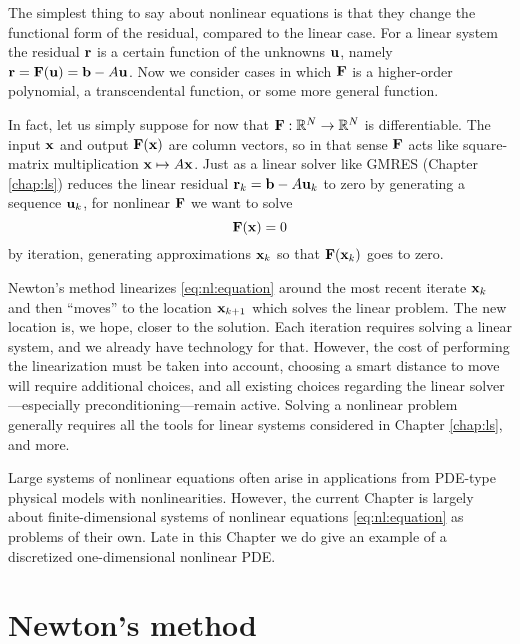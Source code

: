
The simplest thing to say about nonlinear equations is that they change the functional form of the residual, compared to the linear case.  For a linear system the residual $\mathbf{r}$ is a certain function of the unknowns $\mathbf{u}$, namely $\mathbf{r} = \mathbf{F}(\mathbf{u}) = \mathbf{b} - A \mathbf{u}$.  Now we consider cases in which $\mathbf{F}$ is a higher-order polynomial, a transcendental function, or some more general function.

In fact, let us simply suppose for now that $\mathbf{F} : \mathbb{R}^N \to \mathbb{R}^N$ is differentiable.  The input $\mathbf{x}$ and output $\mathbf{F}(\mathbf{x})$ are column vectors, so in that sense $\mathbf{F}$ acts like square-matrix multiplication $\mathbf{x}\mapsto A\mathbf{x}$.  Just as a linear solver like GMRES (Chapter \ref{chap:ls}) reduces the linear residual $\mathbf{r}_k=\mathbf{b} - A \mathbf{u}_k$ to zero by generating a sequence $\mathbf{u}_k$, for nonlinear $\mathbf{F}$ we want to solve
\begin{equation}
   \mathbf{F}(\mathbf{x}) = 0   \label{eq:nl:equation}
\end{equation}
by iteration, generating approximations $\mathbf{x}_k$ so that $\mathbf{F}(\mathbf{x}_k)$ goes to zero.

Newton's method linearizes \eqref{eq:nl:equation} around the most recent iterate $\mathbf{x}_k$ and then ``moves'' to the location $\mathbf{x}_{k+1}$ which solves the linear problem.  The new location is, we hope, closer to the solution.  Each iteration requires solving a linear system, and we already have \PETSc technology for that.  However, the cost of performing the linearization must be taken into account, choosing a smart distance to move will require additional choices, and all existing choices regarding the linear solver---especially preconditioning---remain active.  Solving a nonlinear problem generally requires all the tools for linear systems considered in Chapter \ref{chap:ls}, and more.

Large systems of nonlinear equations often arise in applications from PDE-type physical models with nonlinearities.  However, the current Chapter is largely about finite-dimensional systems of nonlinear equations \eqref{eq:nl:equation} as problems of their own.  Late in this Chapter we do give an example of a discretized one-dimensional nonlinear PDE.


\section{Newton's method}

